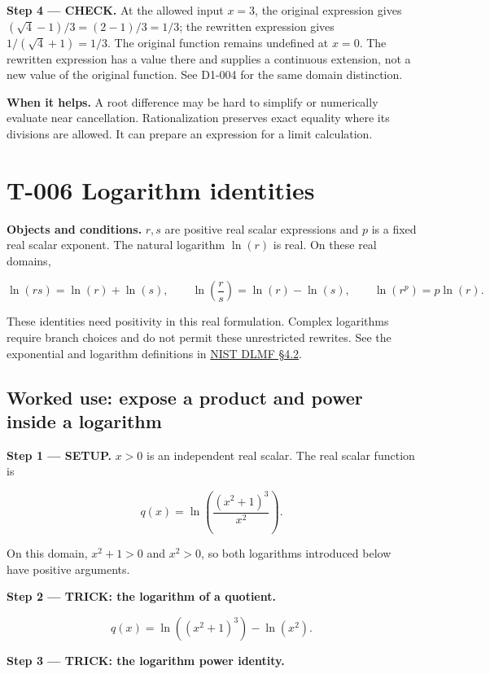 \documentclass[11pt,oneside,openany]{book}
\begin{document}
\endgroup
\textbf{Step 4 --- CHECK.} At the allowed input \(x=3\), the original expression gives
\((\sqrt4-1)/3=(2-1)/3=1/3\); the rewritten expression gives \(1/(\sqrt4+1)=1/3\).
The original function remains undefined at \(x=0\). The rewritten expression has
a value there and supplies a continuous extension, not a new value of the original
function. See D1-004 for the same domain distinction.

\textbf{When it helps.} A root difference may be hard to simplify or numerically
evaluate near cancellation. Rationalization preserves exact equality where its
divisions are allowed. It can prepare an expression for a limit calculation.

\section{T-006 Logarithm identities}

\textbf{Objects and conditions.} \(r,s\) are positive real scalar expressions and \(p\)
is a fixed real scalar exponent. The natural logarithm \(\ln(r)\) is real. On
these real domains,

\[
\ln(rs)=\ln(r)+\ln(s),\qquad
\ln\left(\frac r s\right)=\ln(r)-\ln(s),\qquad
\ln(r^p)=p\ln(r).
\]

These identities need positivity in this real formulation. Complex logarithms
require branch choices and do not permit these unrestricted rewrites. See the
exponential and logarithm definitions in \href{https://dlmf.nist.gov/4.2}{NIST DLMF §4.2}.

\subsection{Worked use: expose a product and power inside a logarithm}

\textbf{Step 1 --- SETUP.} \(x>0\) is an independent real scalar. The real scalar
function is

\[
q(x)=\ln\left(\frac{(x^2+1)^3}{x^2}\right).
\]

On this domain, \(x^2+1>0\) and \(x^2>0\), so both logarithms introduced below
have positive arguments.

\begingroup\color{TrickPurple}
\textbf{Step 2 --- TRICK: the logarithm of a quotient.}

\[
q(x)=\ln\left((x^2+1)^3\right)-\ln(x^2).
\]

\endgroup
\begingroup\color{TrickPurple}
\textbf{Step 3 --- TRICK: the logarithm power identity.}
\end{document}
